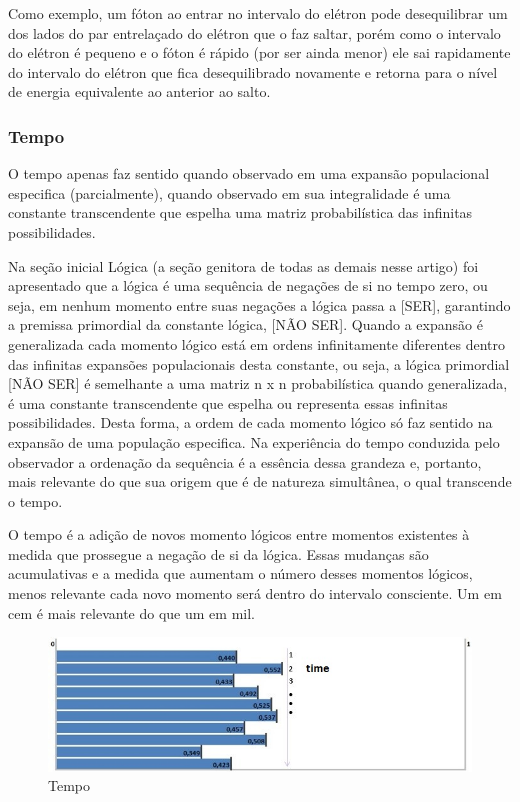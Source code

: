 Como exemplo, um fóton ao entrar no intervalo do elétron pode desequilibrar um dos lados do par entrelaçado do elétron que o faz saltar, porém como o intervalo do elétron é pequeno e o fóton é rápido (por ser ainda menor) ele sai rapidamente do intervalo do elétron que fica desequilibrado novamente e retorna para o nível de energia equivalente ao anterior ao salto.

\subsubsection{Tempo}
O tempo apenas faz sentido quando observado em uma expansão populacional especifica (parcialmente), quando observado em sua integralidade é uma constante transcendente que espelha uma matriz probabilística das infinitas possibilidades. 

Na seção inicial Lógica (a seção genitora de todas as demais nesse artigo) foi apresentado que a lógica é uma sequência de negações de si no tempo zero, ou seja, em nenhum momento entre suas negações a lógica passa a [SER], garantindo a premissa primordial da constante lógica, [NÃO SER]. Quando a expansão é generalizada cada momento lógico está em ordens infinitamente diferentes dentro das infinitas expansões populacionais desta constante, ou seja, a lógica primordial [NÃO SER] é semelhante a uma matriz n x n probabilística quando generalizada, é uma constante transcendente que espelha ou representa essas infinitas possibilidades. Desta forma, a ordem de cada momento lógico só faz sentido na expansão de uma população especifica. Na experiência do tempo conduzida pelo observador a ordenação da sequência é a essência dessa grandeza e, portanto, mais relevante do que sua origem que é de natureza simultânea, o qual transcende o tempo.

O tempo é a adição de novos momento lógicos entre momentos existentes à medida que prossegue a negação de si da lógica. Essas mudanças são acumulativas e a medida que aumentam o número desses momentos lógicos, menos relevante cada novo momento será dentro do intervalo consciente. Um em cem é mais relevante do que um em mil. 
	\begin{figure}[H]
	\caption{Tempo}
	\label{fig:consciousness_time}
	\centering
	\includegraphics[scale=.8]{sections/images/consciousness_time.jpg}
	\end{figure}

